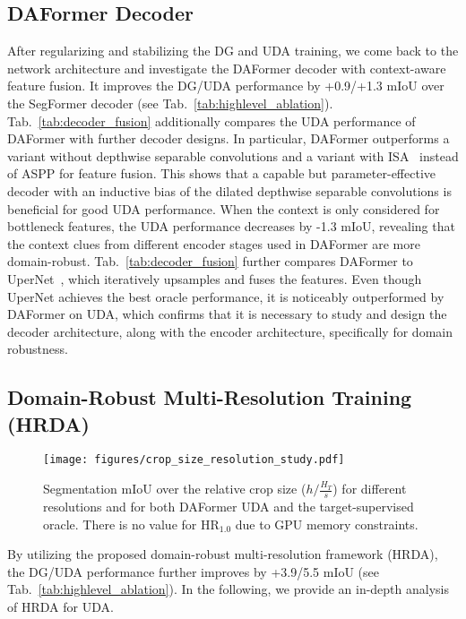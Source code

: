 \documentclass[journal,compsoc]{IEEEtran}
\begin{document}
\subsection{DAFormer Decoder}
\label{sec:exp_context_aware_fusion}

After regularizing and stabilizing the DG and UDA training, we come back to the network architecture and investigate the DAFormer decoder with context-aware feature fusion. 
It improves the DG/UDA performance by +0.9/+1.3 mIoU over the SegFormer decoder (see Tab.~\ref{tab:highlevel_ablation}). Tab.~\ref{tab:decoder_fusion} additionally compares the UDA performance of DAFormer with further decoder designs. In particular, DAFormer outperforms a variant without depthwise separable convolutions and a variant with ISA~\cite{huang2019interlaced} instead of ASPP for feature fusion. This shows that a capable but parameter-effective decoder with an inductive bias of the dilated depthwise separable convolutions is beneficial for good UDA performance.
When the context is only considered for bottleneck features, the UDA performance decreases by -1.3 mIoU, revealing that the context clues from different encoder stages used in DAFormer are more domain-robust.
Tab.~\ref{tab:decoder_fusion} further compares DAFormer to UperNet~\cite{xiao2018unified}, which iteratively upsamples and fuses the features. Even though UperNet achieves the best oracle performance, it is noticeably outperformed by DAFormer on UDA, which confirms that it is necessary to study and design the decoder architecture, along with the encoder architecture, specifically for domain robustness.


\subsection{Domain-Robust Multi-Resolution Training (HRDA)}
\label{sec:exp_resolution_crop_size}
\label{sec:exp_multi_resolution_uda}

\begin{figure}
\centering
\texttt{[image: figures/crop\_size\_resolution\_study.pdf]}
\caption{Segmentation mIoU over the relative crop size ($h / \frac{H_T}{s}$) for different resolutions and for both DAFormer UDA and the target-supervised oracle. There is no value for $\text{HR}_{1.0}$ due to GPU memory constraints.}
\label{fig:crop_resolution}
\end{figure}

By utilizing the proposed domain-robust multi-resolution framework (HRDA), the DG/UDA performance further improves by +3.9/5.5 mIoU (see Tab.~\ref{tab:highlevel_ablation}). In the following, we provide an in-depth analysis of HRDA for UDA.
\end{document}
